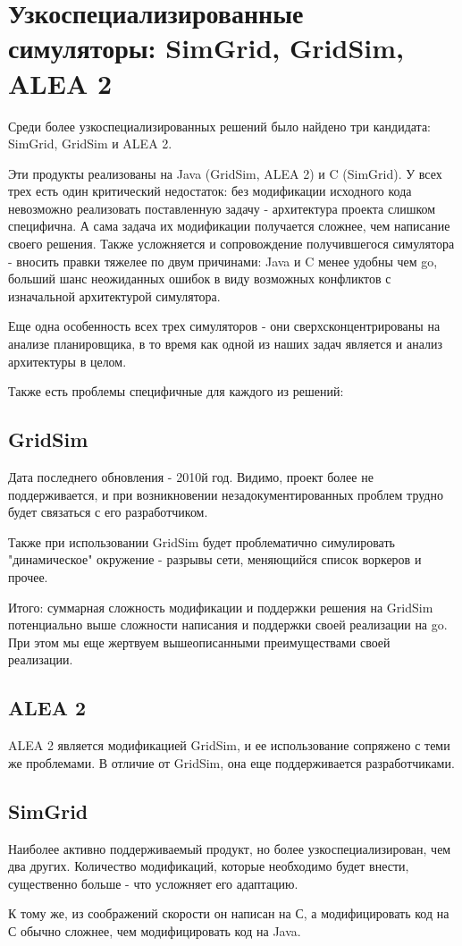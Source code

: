 \section{Узкоспециализированные симуляторы: SimGrid, GridSim, ALEA 2}

Среди более узкоспециализированных решений было найдено три кандидата: SimGrid\cite{casanova2001simgrid}, GridSim\cite{GridSim} и ALEA 2\cite{ALEA}.

Эти продукты реализованы на Java (GridSim, ALEA 2) и C (SimGrid). У всех трех есть один критический недостаток: без модификации исходного кода невозможно реализовать поставленную задачу - архитектура проекта слишком специфична. А сама задача их модификации получается сложнее, чем написание своего решения. Также усложняется и сопровождение получившегося симулятора - вносить правки тяжелее по двум причинами: Java и C менее удобны чем go, больший шанс неожиданных ошибок в виду возможных конфликтов с изначальной архитектурой симулятора.

Еще одна особенность всех трех симуляторов - они сверхсконцентрированы на анализе планировщика, в то время как одной из наших задач является и анализ архитектуры в целом.

Также есть проблемы специфичные для каждого из решений:

\subsection{GridSim}

Дата последнего обновления - 2010й год. Видимо, проект более не поддерживается, и при возникновении незадокументированных проблем трудно будет связаться с его разработчиком.

Также при использовании GridSim будет проблематично симулировать "динамическое" окружение - разрывы сети, меняющийся список воркеров и прочее.

Итого: суммарная сложность модификации и поддержки решения на GridSim потенциально выше сложности написания и поддержки своей реализации на go. При этом мы еще жертвуем вышеописанными преимуществами своей реализации.

\subsection{ALEA 2}

ALEA 2 является модификацией GridSim, и ее использование сопряжено с теми же проблемами. В отличие от GridSim, она еще поддерживается разработчиками.

\subsection{SimGrid}

Наиболее активно поддерживаемый продукт, но более узкоспециализирован, чем два других. Количество модификаций, которые необходимо будет внести, существенно больше - что  усложняет его адаптацию.

К тому же, из соображений скорости он написан на С, а модифицировать код на С обычно сложнее, чем модифицировать код на Java.